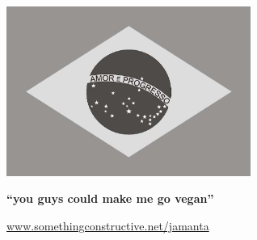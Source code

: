 \clearpage{\thispagestyle{plain}\clearevenpage}

\begin{center}

  \thispagestyle{empty}

  \includegraphics[width=8cm]{brasil.jpg}

  \bigskip

  \LARGE{\textbf{``you guys could make me go vegan''}}

  \bigskip
  \bigskip

  \large{\href{http://www.somethingconstructive.net/jamanta}{www.somethingconstructive.net/jamanta}}

\end{center}
